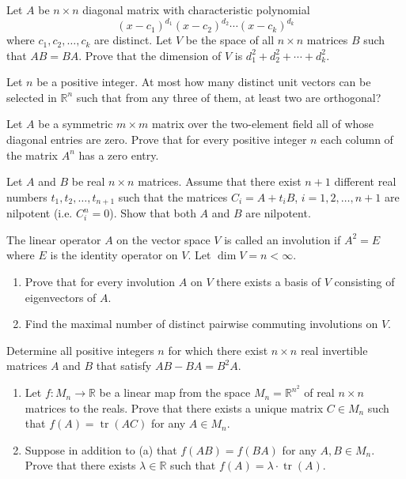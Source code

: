 \documentclass[12pt]{article}
\begin{document}
\begin{problems}
\item Let $A$ be $n\times n$ diagonal matrix with characteristic polynomial
\[
(x-c_1)^{d_1}(x-c_2)^{d_2}\cdots(x-c_k)^{d_k}
\]
where $c_1,c_2,\dots,c_k$ are distinct. Let $V$ be the space of all $n\times n$ matrices $B$ such that $AB=BA$. Prove that the dimension of $V$ is $d_1^2+d_2^2+\cdots+d_k^2$.

\item Let $n$ be a positive integer. At most how many distinct unit vectors can be selected in $\mathbb{R}^n$ such that from any three of them, at least two are orthogonal?

\item Let $A$ be a symmetric $m\times m$ matrix over the two-element field all of whose diagonal entries are zero. Prove that for every positive integer $n$ each column of the matrix $A^n$ has a zero entry.

\item Let $A$ and $B$ be real $n\times n$ matrices. Assume that there exist $n+1$ different real numbers $t_1,t_2,\dots,t_{n+1}$ such that the matrices $C_i=A+t_iB$, $i=1,2,\dots,n+1$ are nilpotent (i.e. $C_i^n=0$). Show that both $A$ and $B$ are nilpotent.

\item The linear operator $A$ on the vector space $V$ is called an involution if $A^2=E$ where $E$ is the identity operator on $V$. Let $\dim V = n<\infty$.
\begin{enumerate}[label=(\roman*)]
\item Prove that for every involution $A$ on $V$ there exists a basis of $V$ consisting of eigenvectors of $A$.
\item Find the maximal number of distinct pairwise commuting involutions on $V$.
\end{enumerate}

\item Determine all positive integers $n$ for which there exist $n\times n$ real invertible matrices $A$ and $B$ that satisfy $AB-BA = B^2A$.

\item
\begin{enumerate}[label=(\alph*)]
\item Let $f:M_n\to\mathbb{R}$ be a linear map from the space $M_n=\mathbb{R}^{n^2}$ of real $n\times n$ matrices to the reals. Prove that there exists a unique matrix $C\in M_n$ such that $f(A)=\operatorname{tr}(AC)$ for any $A\in M_n$.
\item Suppose in addition to (a) that $f(AB)=f(BA)$ for any $A,B\in M_n$. Prove that there exists $\lambda\in\mathbb{R}$ such that $f(A)=\lambda\cdot\operatorname{tr}(A)$.
\end{enumerate}


\end{problems}
\end{document}
